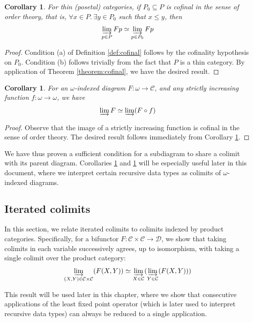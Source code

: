 \documentclass{msthesis}
\newtheorem{corollary}[theorem]{Corollary}
\theoremstyle{definition}
\newcommand{\mcC}{\mathcal{C}}
\newcommand{\mcD}{\mathcal{D}}
\newcommand{\colim}{\varinjlim}
\begin{document}
\begin{corollary}\label{cor:thincofinal}
    For thin (posetal) categories,
    if $P_0 \subseteq P$ is cofinal in the sense of order theory, that is, $\forall x \in P.\ \exists y \in P_0$ such that $x \le y$, then 
    \[ \colim_{p \in P} Fp \simeq \colim_{p \in P_0} Fp \]
\end{corollary}
\begin{proof}
    Condition (a) of Definition \ref{def:cofinal} follows by the cofinality hypothesis on $P_0$.  Condition (b) follows trivially from the fact that $P$ is a thin category.  By application of Theorem \ref{theorem:cofinal}, we have the desired result.
\end{proof}

\begin{corollary}\label{cor:omegacofinal}
    For an $\omega$-indexed diagram $F : \omega \to \mcC$, and any strictly increasing function $f : \omega \to \omega$, we have
    \[ \colim F \simeq \colim (F \circ f)\]
\end{corollary}
\begin{proof}
    Observe that the image of a strictly increasing function is cofinal in the sense of order theory.  The desired result follows immediately from Corollary \ref{cor:thincofinal}.
\end{proof}

We have thus proven a sufficient condition for a subdiagram to share a colimit with its parent diagram.  Corollaries \ref{cor:thincofinal} and \ref{cor:omegacofinal} will be especially useful later in this document, where we interpret certain recursive data types as colimits of $\omega$-indexed diagrams.

\subsection{Iterated colimits}\label{sec:iteratedcolimits}

In this section, we relate iterated colimits to colimits indexed by product categories. Specifically, for a bifunctor $F : \mcC \times \mcC \to \mcD$, we show that taking colimits in each variable successively agrees, up to isomorphism, with taking a single colimit over the product category:
\[ \colim_{(X, Y) \in \mcC \times \mcC}(F(X, Y)) \simeq \colim_{X \in \mcC}(\colim_{Y \in \mcC}(F(X,Y))) \]

This result will be used later in this chapter, where we show that consecutive applications of the least fixed point operator (which is later used to interpret recursive data types) can always be reduced to a single application.
\end{document}
